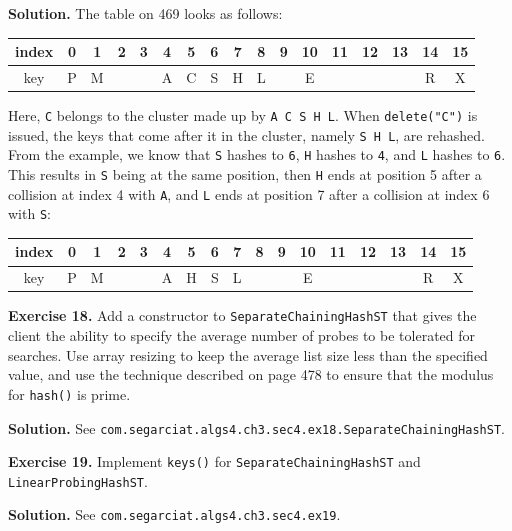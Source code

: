 \documentclass[12pt, a4paper]{article}
\newenvironment{ex}[2][Exercise]
{\par\medskip\noindent \textbf{#1 #2.}}
{\medskip}
\newenvironment{sol}[1][Solution]
{\par\medskip\noindent \textbf{#1.} }
{\medskip}
\begin{document}
	\begin{sol}
		The table on 469 looks as follows:
		\begin{center}
			\begin{tabular}{c|cccccccccccccccc}
				index & 0 & 1 & 2 & 3 & 4 & 5 & 6 & 7 & 8 & 9 & 10 & 11 & 12 & 13 & 14 & 15\\
				\hline
				key & P & M & {} & {} & A & C & S & H & L & {} & E & {} & {} & {} & R & X
			\end{tabular}
		\end{center}
		Here, \texttt{C} belongs to the cluster made up by \texttt{A C S H L}. When
		\texttt{delete("C")} is issued, the keys that come after it in the cluster,
		namely \texttt{S H L}, are rehashed. From the example, we know that \texttt{S}
		hashes to \texttt{6}, \texttt{H} hashes to \texttt{4}, and \texttt{L} hashes to
		\texttt{6}. This results in \texttt{S} being at the same position, then
		\texttt{H} ends at position 5 after a collision at index 4 with \texttt{A},
		and \texttt{L} ends at position 7 after a collision at index 6 with \texttt{S}:
		\begin{center}
			\begin{tabular}{c|cccccccccccccccc}
				index & 0 & 1 & 2 & 3 & 4 & 5 & 6 & 7 & 8 & 9 & 10 & 11 & 12 & 13 & 14 & 15\\
				\hline
				key & P & M & {} & {} & A & H & S & L & {} & {} & E & {} & {} & {} & R & X
			\end{tabular}
		\end{center}
	\end{sol}
	\begin{ex}{18}
		Add a constructor to \texttt{SeparateChainingHashST} that gives the client the ability
		to specify the average number of probes to be tolerated for searches. Use array resizing
		to keep the average list size less than the specified value, and use the technique described
		on page 478 to ensure that the modulus for \texttt{hash()} is prime.
	\end{ex}
	\begin{sol}
		See \texttt{com.segarciat.algs4.ch3.sec4.ex18.SeparateChainingHashST}.
	\end{sol}
	\begin{ex}{19}
		Implement \texttt{keys()} for \texttt{SeparateChainingHashST} and \texttt{LinearProbingHashST}.
	\end{ex}
	\begin{sol}
		See \texttt{com.segarciat.algs4.ch3.sec4.ex19}.
	\end{sol}
\end{document}
